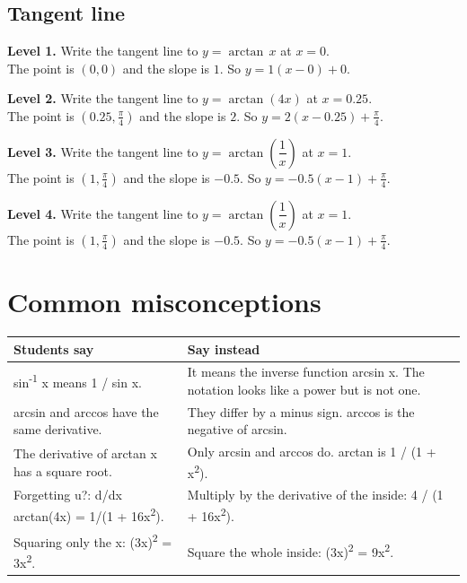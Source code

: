\documentclass[11pt]{article}
\begin{document}
\subsection*{Tangent line}
\noindent\textbf{Level 1.} Write the tangent line to $y=\arctan\,x$ at $x=0$.\\  \quad The point is $(0,0)$ and the slope is $1$. So $y=1(x-0)+0$.\par\medskip
\noindent\textbf{Level 2.} Write the tangent line to $y=\arctan\left(4x\right)$ at $x=0.25$.\\  \quad The point is $(0.25,\tfrac{\pi}{4})$ and the slope is $2$. So $y=2(x-0.25)+\tfrac{\pi}{4}$.\par\medskip
\noindent\textbf{Level 3.} Write the tangent line to $y=\arctan\left(\dfrac1x\right)$ at $x=1$.\\  \quad The point is $(1,\tfrac{\pi}{4})$ and the slope is $-0.5$. So $y=-0.5(x-1)+\tfrac{\pi}{4}$.\par\medskip
\noindent\textbf{Level 4.} Write the tangent line to $y=\arctan\left(\dfrac1x\right)$ at $x=1$.\\  \quad The point is $(1,\tfrac{\pi}{4})$ and the slope is $-0.5$. So $y=-0.5(x-1)+\tfrac{\pi}{4}$.\par\medskip
\section*{Common misconceptions}\begin{tabularx}{\textwidth}{@{}X X@{}}\toprule Students say & Say instead\\\midrule
sin\textsuperscript{-1} x means 1 / sin x. & It means the inverse function arcsin x. The notation looks like a power but is not one.\\
arcsin and arccos have the same derivative. & They differ by a minus sign. arccos is the negative of arcsin.\\
The derivative of arctan x has a square root. & Only arcsin and arccos do. arctan is 1 / (1 + x\textsuperscript{2}).\\
Forgetting u?: d/dx arctan(4x) = 1/(1 + 16x\textsuperscript{2}). & Multiply by the derivative of the inside: 4 / (1 + 16x\textsuperscript{2}).\\
Squaring only the x: (3x)\textsuperscript{2} = 3x\textsuperscript{2}. & Square the whole inside: (3x)\textsuperscript{2} = 9x\textsuperscript{2}.\\
\bottomrule\end{tabularx}
\end{document}
